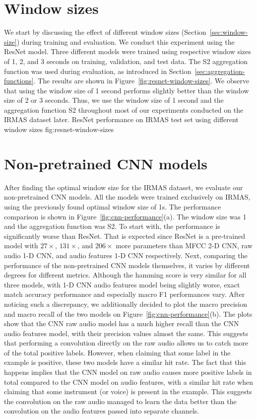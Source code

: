 \section{Window sizes}
\label{sec:eval:window-sizes}
We start by discussing the effect of different window sizes (Section~\ref{sec:window-size}) during training and evaluation. We conduct this experiment using the ResNet model. Three different models were trained using respective window sizes of 1, 2, and 3 seconds on training, validation, and test data. The S2 aggregation function was used during evaluation, as introduced in Section~\ref{sec:aggregation-functions}. The results are shown in Figure~\ref{fig:resnet-window-sizes}. We observe that using the window size of 1 second performs slightly better than the window size of 2 or 3 seconds. Thus, we use the window size of 1 second and the aggregation function S2 throughout most of our experiments conducted on the IRMAS dataset later.
	        {ResNet performance on IRMAS test set using different window sizes}
                {fig:resnet-window-sizes}

\section{Non-pretrained CNN models}
\label{sec:eval:cnn-models}
After finding the optimal window size for the IRMAS dataset, we evaluate our non-pretrained CNN models. All the models were trained exclusively on IRMAS, using the previously found optimal window size of 1s. The performance comparison is shown in Figure~\ref{fig:cnn-performance}(a). The window size was 1 and the aggregation function was S2. To start with, the performance is significantly worse than ResNet. That is expected since ResNet is a pre-trained model with $27 \times$, $131 \times$, and $206 \times$ more parameters than MFCC 2-D CNN, raw audio 1-D CNN, and audio features 1-D CNN respectively. Next, comparing the performance of the non-pretrained CNN models themselves, it varies by different degrees for different metrics. Although the hamming score is very similar for all three models, with 1-D CNN audio features model being slightly worse, exact match accuracy performance and especially macro F1 performances vary. After noticing such a discrepancy, we additionally decided to plot the macro precision and macro recall of the two models on Figure~\ref{fig:cnn-performance}(b). The plots show that the CNN raw audio model has a much higher recall than the CNN audio features model, with their precision values almost the same. This suggests that performing a convolution directly on the raw audio allows us to catch more of the total positive labels. However, when claiming that some label in the example is positive, these two models have a similar hit rate. The fact that this happens implies that the CNN model on raw audio causes more positive labels in total compared to the CNN model on audio features, with a similar hit rate when claiming that some instrument (or voice) is present in the example. This suggests the convolution on the raw audio managed to learn the data better than the convolution on the audio features passed into separate channels.

